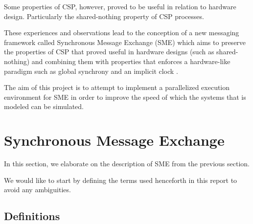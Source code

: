Some properties of CSP, however, proved to be useful in relation to
hardware design. Particularly the shared-nothing property of CSP
processes.

These experiences and observations lead to the conception of a new
messaging framework called Synchronous Message Exchange (SME) which
aims to preserve the properties of CSP that proved useful in hardware
designs (such as shared-nothing) and combining them with properties that
enforces a hardware-like paradigm such as global synchrony and an
implicit clock \cite{vinter2014synchronous}.

The aim of this project is to attempt to implement a parallelized
execution environment for SME in order to improve the speed of which
the systems that is modeled can be simulated.



\section{Synchronous Message Exchange}
In this section, we elaborate on the description of SME from the
previous section.

We would like to start by defining the terms used henceforth in this
report to avoid any ambiguities.



\subsection{Definitions}

